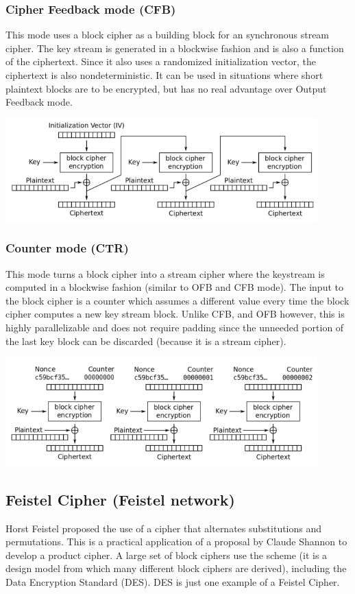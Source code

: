\documentclass{math}
\begin{document}
\subsubsection*{Cipher Feedback mode (CFB)}
This mode uses a block cipher as a building block for an synchronous stream
cipher. The key stream is generated in a blockwise fashion and is also a
function of the ciphertext. Since it also uses a randomized initialization
vector, the ciphertext is also nondeterministic. It can be used in situations
where short plaintext blocks are to be encrypted, but has no real advantage
over Output Feedback mode.
\begin{center}
  \includegraphics[width=12cm]{assets/cfb.png}
\end{center}

\subsubsection*{Counter mode (CTR)}
This mode turns a block cipher into a stream cipher where the keystream is
computed in a blockwise fashion (similar to OFB and CFB mode). The input to the
block cipher is a counter which assumes a different value every time the block
cipher computes a new key stream block. Unlike CFB, and OFB however, this is
highly parallelizable and does not require padding since the unneeded portion
of the last key block can be discarded (because it is a stream cipher).
\begin{center}
  \includegraphics[width=12cm]{assets/ctr.png}
\end{center}

\subsection*{Feistel Cipher (Feistel network)}
Horst Feistel proposed the use of a cipher that alternates substitutions and
permutations. This is a practical application of a proposal by Claude Shannon to
develop a product cipher. A large set of block ciphers use the scheme (it is a
design model from which many different block ciphers are derived), including the
Data Encryption Standard (DES). DES is just one example of a Feistel Cipher.
\end{document}
